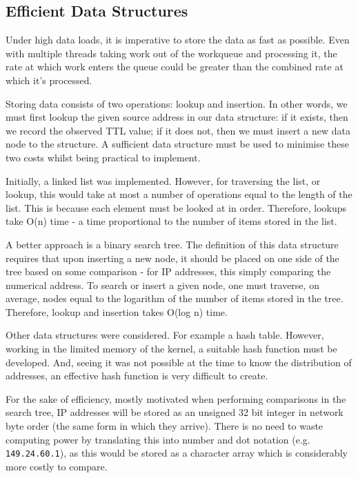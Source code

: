\documentclass[12pt,twoside]{article}
\begin{document}
\subsection{Efficient Data Structures} \label{data_structures}

Under high data loads, it is imperative to store the data as fast as possible. Even with multiple threads taking work out of the workqueue and processing it, the rate at which work enters the queue could be greater than the combined rate at which it's processed.

Storing data consists of two operations: lookup and insertion. In other words, we must first lookup the given source address in our data structure: if it exists, then we record the observed TTL value; if it does not, then we must insert a new data node to the structure. A sufficient data structure must be used to minimise these two costs whilst being practical to implement.

Initially, a linked list was implemented. However, for traversing the list, or lookup, this would take at most a number of operations equal to the length of the list. This is because each element must be looked at in order. Therefore, lookups take O(n) time - a time proportional to the number of items stored in the list.

A better approach is a binary search tree. The definition of this data structure requires that upon inserting a new node, it should be placed on one side of the tree based on some comparison - for IP addresses, this simply comparing the numerical address. To search or insert a given node, one must traverse, on average, nodes equal to the logarithm of the number of items stored in the tree. Therefore, lookup and insertion takes O(log n) time.

Other data structures were considered. For example a hash table. However, working in the limited memory of the kernel, a suitable hash function must be developed. And, seeing it was not possible at the time to know the distribution of addresses, an effective hash function is very difficult to create.

For the sake of efficiency, mostly motivated when performing comparisons in the search tree, IP addresses will be stored as an unsigned 32 bit integer in network byte order (the same form in which they arrive). There is no need to waste computing power by translating this into number and dot notation (e.g. \texttt{149.24.60.1}), as this would be stored as a character array which is considerably more costly to compare.
\end{document}

